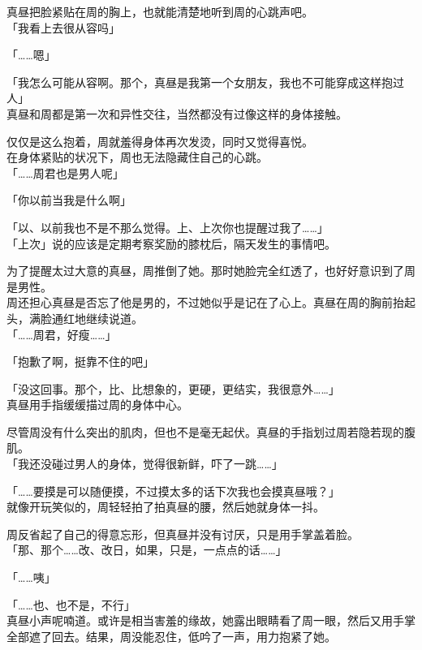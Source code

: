 真昼把脸紧贴在周的胸上，也就能清楚地听到周的心跳声吧。\\

「我看上去很从容吗」

「……嗯」

「我怎么可能从容啊。那个，真昼是我第一个女朋友，我也不可能穿成这样抱过人」\\

真昼和周都是第一次和异性交往，当然都没有过像这样的身体接触。

仅仅是这么抱着，周就羞得身体再次发烫，同时又觉得喜悦。\\

在身体紧贴的状况下，周也无法隐藏住自己的心跳。\\

「……周君也是男人呢」

「你以前当我是什么啊」

「以、以前我也不是不那么觉得。上、上次你也提醒过我了……」\\

「上次」说的应该是定期考察奖励的膝枕后，隔天发生的事情吧。

为了提醒太过大意的真昼，周推倒了她。那时她脸完全红透了，也好好意识到了周是男性。\\

周还担心真昼是否忘了他是男的，不过她似乎是记在了心上。真昼在周的胸前抬起头，满脸通红地继续说道。\\

「……周君，好瘦……」

「抱歉了啊，挺靠不住的吧」

「没这回事。那个，比、比想象的，更硬，更结实，我很意外……」\\

真昼用手指缓缓描过周的身体中心。

尽管周没有什么突出的肌肉，但也不是毫无起伏。真昼的手指划过周若隐若现的腹肌。\\

「我还没碰过男人的身体，觉得很新鲜，吓了一跳……」

「……要摸是可以随便摸，不过摸太多的话下次我也会摸真昼哦？」\\

就像开玩笑似的，周轻轻拍了拍真昼的腰，然后她就身体一抖。

周反省起了自己的得意忘形，但真昼并没有讨厌，只是用手掌盖着脸。\\

「那、那个……改、改日，如果，只是，一点点的话……」

「……咦」

「……也、也不是，不行」\\

真昼小声呢喃道。或许是相当害羞的缘故，她露出眼睛看了周一眼，然后又用手掌全部遮了回去。结果，周没能忍住，低吟了一声，用力抱紧了她。
